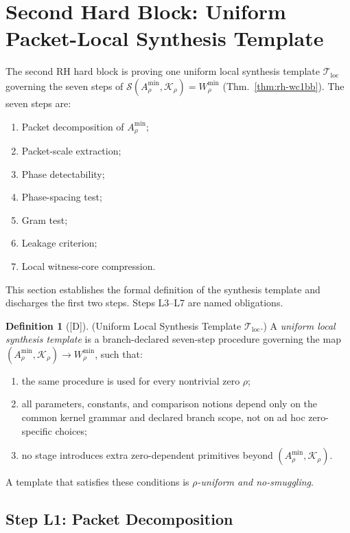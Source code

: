 \documentclass[12pt,oneside]{amsbook}
\theoremstyle{plain}
\theoremstyle{definition}
\newtheorem{definition}[theorem]{Definition}
\theoremstyle{remark}
\newcommand{\status}[1]{\textup{[#1]}}
\begin{document}
\section{Second Hard Block: Uniform Packet-Local Synthesis Template}
\label{sec:rh-second-hard-block}

The second RH hard block is proving one uniform local synthesis
template $\mathcal{T}_{\mathrm{loc}}$ governing the seven steps of
$\mathcal{S}(A_\rho^{\min}, \mathcal{K}_\rho) = W_\rho^{\min}$
(Thm.~\ref{thm:rh-wc1bb}). The seven steps are:
\begin{enumerate}[label=\textup{(L\arabic*)}]
 \item Packet decomposition of $A_\rho^{\min}$;
 \item Packet-scale extraction;
 \item Phase detectability;
 \item Phase-spacing test;
 \item Gram test;
 \item Leakage criterion;
 \item Local witness-core compression.
\end{enumerate}
This section establishes the formal definition of the synthesis
template and discharges the first two steps. Steps L3--L7 are
named obligations.

\begin{definition}[\status{D}]\label{def:rh-tloc-template}
\textup{(Uniform Local Synthesis Template $\mathcal{T}_{\mathrm{loc}}$.)}
A \emph{uniform local synthesis template} is a branch-declared seven-step
procedure governing the map
$(A_\rho^{\min}, \mathcal{K}_\rho) \to W_\rho^{\min}$, such that:
\begin{enumerate}[label=\textup{(\arabic*)}]
 \item the same procedure is used for every nontrivial zero $\rho$;
 \item all parameters, constants, and comparison notions depend only
 on the common kernel grammar and declared branch scope, not on
 ad hoc zero-specific choices;
 \item no stage introduces extra zero-dependent primitives beyond
 $(A_\rho^{\min}, \mathcal{K}_\rho)$.
\end{enumerate}
A template that satisfies these conditions is \emph{$\rho$-uniform
and no-smuggling}.
\end{definition}

\subsection{Step L1: Packet Decomposition}
\end{document}
